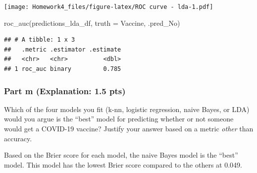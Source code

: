 \documentclass[
]{article}
\newenvironment{Shaded}{\begin{snugshade}}{\end{snugshade}}
\newcommand{\AttributeTok}[1]{\textcolor[rgb]{0.77,0.63,0.00}{#1}}
\newcommand{\FunctionTok}[1]{\textcolor[rgb]{0.00,0.00,0.00}{#1}}
\newcommand{\NormalTok}[1]{#1}
\begin{document}
\texttt{[image: Homework4\_files/figure-latex/ROC curve - lda-1.pdf]}

\begin{Shaded}
\begin{Highlighting}[]
\FunctionTok{roc\_auc}\NormalTok{(predictions\_lda\_df, }\AttributeTok{truth =}\NormalTok{ Vaccine, .pred\_No)}
\end{Highlighting}
\end{Shaded}

\begin{verbatim}
## # A tibble: 1 x 3
##   .metric .estimator .estimate
##   <chr>   <chr>          <dbl>
## 1 roc_auc binary         0.785
\end{verbatim}

\hypertarget{part-m-explanation-1.5-pts}{%
\subsubsection{Part m (Explanation: 1.5
pts)}\label{part-m-explanation-1.5-pts}}

Which of the four models you fit (k-nn, logistic regression, naive
Bayes, or LDA) would you argue is the ``best'' model for predicting
whether or not someone would get a COVID-19 vaccine? Justify your answer
based on a metric \emph{other} than accuracy.

Based on the Brier score for each model, the naive Bayes model is the
``best'' model. This model has the lowest Brier score compared to the
others at 0.049.
\end{document}
